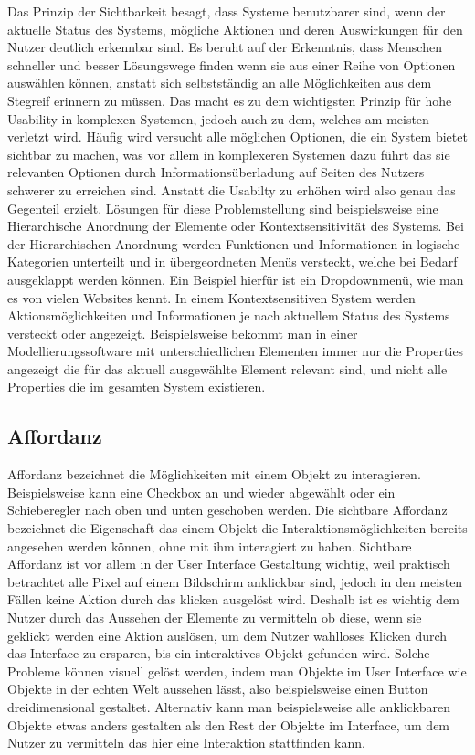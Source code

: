 Das Prinzip der Sichtbarkeit besagt, dass Systeme benutzbarer sind, wenn der aktuelle Status des Systems, mögliche Aktionen und deren Auswirkungen für den Nutzer deutlich erkennbar sind.
Es beruht auf der Erkenntnis, dass Menschen schneller und besser Lösungswege finden wenn sie aus einer Reihe von Optionen auswählen können, anstatt sich selbstständig an alle Möglichkeiten aus dem Stegreif erinnern zu müssen\cite{Lidwell.2010}.
Das macht es zu dem wichtigsten Prinzip für hohe Usability in komplexen Systemen, jedoch auch zu dem, welches am meisten verletzt wird\cite{Norman.2016}.
Häufig wird versucht alle möglichen Optionen, die ein System bietet sichtbar zu machen, was vor allem in komplexeren Systemen dazu führt das sie relevanten Optionen durch Informationsüberladung auf Seiten des Nutzers schwerer zu erreichen sind. 
Anstatt die Usabilty zu erhöhen wird also genau das Gegenteil erzielt.
Lösungen für diese Problemstellung sind beispielsweise eine Hierarchische Anordnung der Elemente oder Kontextsensitivität des Systems.
Bei der Hierarchischen Anordnung werden Funktionen und Informationen in logische Kategorien unterteilt und in übergeordneten Menüs versteckt, welche bei Bedarf ausgeklappt werden können. Ein Beispiel hierfür ist ein Dropdownmenü, wie man es von vielen Websites kennt.
In einem Kontextsensitiven System werden Aktionsmöglichkeiten und Informationen je nach aktuellem Status des Systems versteckt oder angezeigt. Beispielsweise bekommt man in einer Modellierungssoftware mit unterschiedlichen Elementen immer nur die Properties angezeigt die für das aktuell ausgewählte Element relevant sind, und nicht alle Properties die im gesamten System existieren\cite{Lidwell.2010}.


\subsection*{Affordanz}

Affordanz bezeichnet die Möglichkeiten mit einem Objekt zu interagieren. Beispielsweise kann eine Checkbox an und wieder abgewählt oder ein Schieberegler nach oben und unten geschoben werden.
Die sichtbare Affordanz bezeichnet die Eigenschaft das einem Objekt die Interaktionsmöglichkeiten bereits angesehen werden können, ohne mit ihm interagiert zu haben.
Sichtbare Affordanz ist vor allem in der User Interface Gestaltung wichtig, weil praktisch betrachtet alle Pixel auf einem Bildschirm anklickbar sind, jedoch in den meisten Fällen keine Aktion durch das klicken ausgelöst wird.
Deshalb ist es wichtig dem Nutzer durch das Aussehen der Elemente zu vermitteln ob diese, wenn sie geklickt werden eine Aktion auslösen, um dem Nutzer wahlloses Klicken durch das Interface zu ersparen, bis ein interaktives Objekt gefunden wird.
Solche Probleme können visuell gelöst werden, indem man Objekte im User Interface wie Objekte in der echten Welt aussehen lässt, also beispielsweise einen Button dreidimensional gestaltet.
Alternativ kann man beispielsweise alle anklickbaren Objekte etwas anders gestalten als den Rest der Objekte im Interface, um dem Nutzer zu vermitteln das hier eine Interaktion stattfinden kann\cite{Knight.2019c}.

